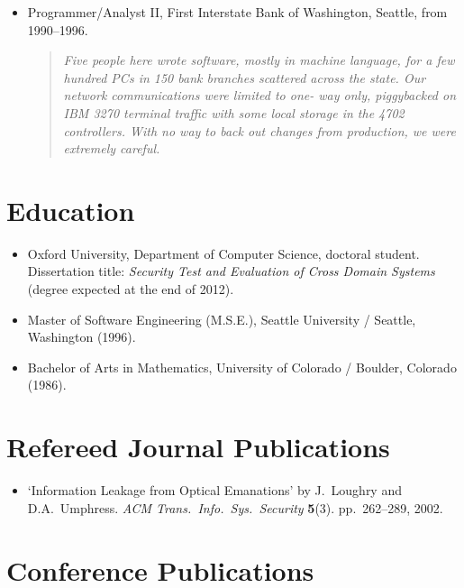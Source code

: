 \documentclass[letterpaper]{article}
\begin{document}
\begin{itemize}
	\item Programmer/Analyst II, First Interstate Bank of Washington, Seattle, from 1990--1996.

		\begin{quote}\vspace{-2mm}
			\emph{Five people here wrote software, mostly in machine language, for a few hundred
			PCs in 150 bank branches scattered across the state.  Our network communications were
			limited to one- way only, piggybacked on IBM 3270 terminal traffic with some local
			storage in the 4702 controllers.  With no way to back out changes from production,
			we were extremely careful.}
		\end{quote}

\end{itemize}

\section*{Education} %

\begin{itemize}
    \item Oxford University, Department of Computer Science,
		doctoral student.  Dissertation title: \emph{Security Test and Evaluation
		of Cross Domain Systems} (degree expected at the end of 2012).

    \item Master of Software Engineering (M.S.E.), Seattle
		University / Seattle, Washington (1996).

    \item Bachelor of Arts in Mathematics, University of
		Colorado / Boulder, Colorado (1986).
\end{itemize}

\section*{Refereed Journal Publications} %

\begin{itemize}
    \item `Information Leakage from Optical Emanations' by J.\ Loughry
    and D.A.\ Umphress. \emph{ACM Trans.\ Info.\ Sys.\ Security} \textbf{5}(3).
    pp.\ 262--289, 2002.
\end{itemize}

\section*{Conference Publications} %
\end{document}
